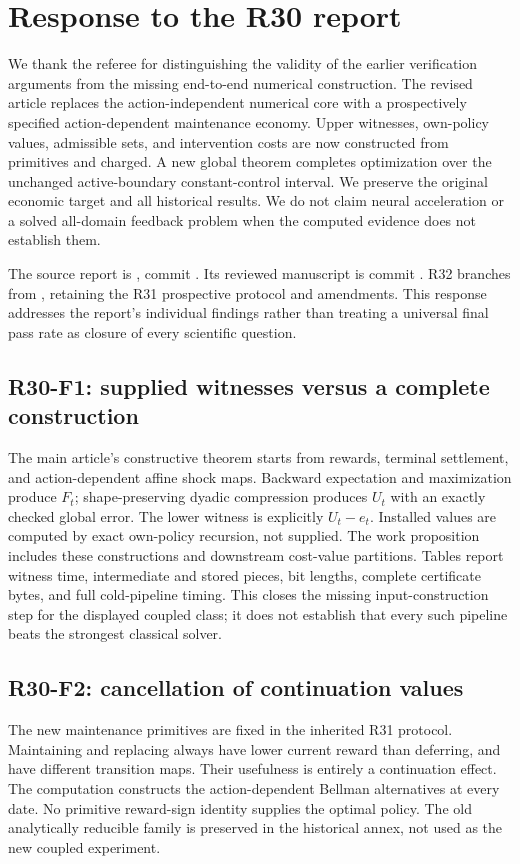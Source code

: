 \section{Response to the R30 report}
We thank the referee for distinguishing the validity of the earlier verification arguments from the missing end-to-end numerical construction. The revised article replaces the action-independent numerical core with a prospectively specified action-dependent maintenance economy. Upper witnesses, own-policy values, admissible sets, and intervention costs are now constructed from primitives and charged. A new global theorem completes optimization over the unchanged active-boundary constant-control interval. We preserve the original economic target and all historical results. We do not claim neural acceleration or a solved all-domain feedback problem when the computed evidence does not establish them.

The source report is , commit . Its reviewed manuscript is commit . R32 branches from , retaining the R31 prospective protocol and amendments. This response addresses the report's individual findings rather than treating a universal final pass rate as closure of every scientific question.

\subsection{R30-F1: supplied witnesses versus a complete construction}
The main article's constructive theorem starts from rewards, terminal settlement, and action-dependent affine shock maps. Backward expectation and maximization produce $F_t$; shape-preserving dyadic compression produces $U_t$ with an exactly checked global error. The lower witness is explicitly $U_t-e_t$. Installed values are computed by exact own-policy recursion, not supplied. The work proposition includes these constructions and downstream cost-value partitions. Tables report witness time, intermediate and stored pieces, bit lengths, complete certificate bytes, and full cold-pipeline timing. This closes the missing input-construction step for the displayed coupled class; it does not establish that every such pipeline beats the strongest classical solver.

\subsection{R30-F2: cancellation of continuation values}
The new maintenance primitives are fixed in the inherited R31 protocol. Maintaining and replacing always have lower current reward than deferring, and have different transition maps. Their usefulness is entirely a continuation effect. The computation constructs the action-dependent Bellman alternatives at every date. No primitive reward-sign identity supplies the optimal policy. The old analytically reducible family is preserved in the historical annex, not used as the new coupled experiment.

